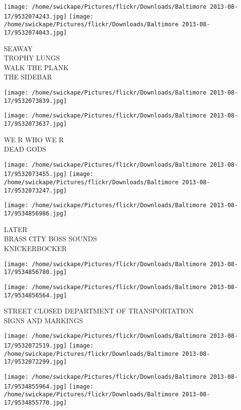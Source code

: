 \documentclass[10pt,letterpaper]{article}
\begin{document}
\texttt{[image: /home/swickape/Pictures/flickr/Downloads/Baltimore 2013-08-17/9532074243.jpg]}
\texttt{[image: /home/swickape/Pictures/flickr/Downloads/Baltimore 2013-08-17/9532074043.jpg]}

SEAWAY\\
TROPHY LUNGS\\
WALK THE PLANK\\
THE SIDEBAR\\
\pagebreak

\texttt{[image: /home/swickape/Pictures/flickr/Downloads/Baltimore 2013-08-17/9532073839.jpg]}

\vspace{0.25in}
\texttt{[image: /home/swickape/Pictures/flickr/Downloads/Baltimore 2013-08-17/9532073637.jpg]}

WE R WHO WE R\\
DEAD GODS\\
\pagebreak

\texttt{[image: /home/swickape/Pictures/flickr/Downloads/Baltimore 2013-08-17/9532073455.jpg]}
\texttt{[image: /home/swickape/Pictures/flickr/Downloads/Baltimore 2013-08-17/9532073247.jpg]}

\texttt{[image: /home/swickape/Pictures/flickr/Downloads/Baltimore 2013-08-17/9534856986.jpg]}

LATER\\
BRASS CITY BOSS SOUNDS\\
KNICKERBOCKER\\
\pagebreak

\texttt{[image: /home/swickape/Pictures/flickr/Downloads/Baltimore 2013-08-17/9534856780.jpg]}

\vspace{0.25in}
\texttt{[image: /home/swickape/Pictures/flickr/Downloads/Baltimore 2013-08-17/9534856564.jpg]}

STREET CLOSED DEPARTMENT OF TRANSPORTATION\\
SIGNS AND MARKINGS\\
\pagebreak

\texttt{[image: /home/swickape/Pictures/flickr/Downloads/Baltimore 2013-08-17/9532072519.jpg]}
\texttt{[image: /home/swickape/Pictures/flickr/Downloads/Baltimore 2013-08-17/9532072299.jpg]}

\texttt{[image: /home/swickape/Pictures/flickr/Downloads/Baltimore 2013-08-17/9534855964.jpg]}
\texttt{[image: /home/swickape/Pictures/flickr/Downloads/Baltimore 2013-08-17/9534855770.jpg]}
\end{document}
